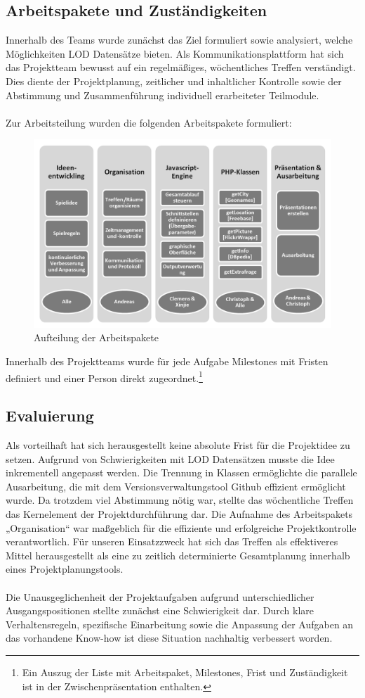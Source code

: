 \documentclass[a4paper, 11pt]{article}
\begin{document}
\subsection{Arbeitspakete und Zuständigkeiten}
Innerhalb des Teams wurde zunächst das Ziel formuliert sowie analysiert, welche Möglichkeiten LOD Datensätze bieten. Als Kommunikationsplattform hat sich das Projektteam bewusst auf ein regelmäßiges, wöchentliches Treffen verständigt. Dies diente der Projektplanung, zeitlicher und inhaltlicher Kontrolle sowie der Abstimmung und Zusammenführung individuell erarbeiteter Teilmodule.\\\\
Zur Arbeitsteilung wurden die folgenden Arbeitspakete formuliert:
\begin{figure}[H]
	\centering
	\includegraphics[width=1.0\columnwidth, angle=0]{projektplanung_organigramm_sw.png}
	\caption{Aufteilung der Arbeitspakete}
	\label{img:grafik-dummy}
\end{figure}
Innerhalb des Projektteams wurde für jede Aufgabe Milestones mit Fristen definiert und einer Person direkt zugeordnet.\footnote{Ein Auszug der Liste mit Arbeitspaket, Milestones, Frist und Zuständigkeit ist in der Zwischenpräsentation enthalten.}
\subsection{Evaluierung}
Als vorteilhaft hat sich herausgestellt keine absolute Frist für die Projektidee zu setzen. Aufgrund von Schwierigkeiten mit LOD Datensätzen musste die Idee inkrementell angepasst werden. Die Trennung in Klassen ermöglichte die parallele Ausarbeitung, die mit dem Versionsverwaltungstool Github  effizient ermöglicht wurde. Da trotzdem viel Abstimmung nötig war, stellte das wöchentliche Treffen das Kernelement der Projektdurchführung dar.  Die Aufnahme des Arbeitspakets „Organisation“ war maßgeblich für die effiziente und erfolgreiche Projektkontrolle verantwortlich. Für unseren Einsatzzweck hat sich das Treffen als effektiveres Mittel herausgestellt als eine zu zeitlich determinierte Gesamtplanung innerhalb eines Projektplanungstools.\\\\
Die Unausgeglichenheit der Projektaufgaben aufgrund unterschiedlicher Ausgangspositionen stellte zunächst eine Schwierigkeit dar. Durch klare Verhaltensregeln, spezifische Einarbeitung sowie die Anpassung der Aufgaben an das vorhandene Know-how ist diese Situation nachhaltig verbessert worden.
\newpage
\end{document}
